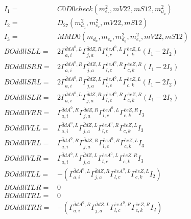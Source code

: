 \documentclass[A4,landscape]{article}
\begin{document}
\begin{align} 
I_1 = & C0D0check(m^2_{e_{{c}}}, mV22, mS12, m^2_{d_{{a}}}) \\ 
I_2 = & D_{27}(m^2_{d_{{a}}}, m^2_{e_{{c}}}, mV22, mS12) \\ 
I_3 = & MMD0(m_{d_{{a}}}, m_{e_{{c}}}, m^2_{d_{{a}}}, m^2_{e_{{c}}}, mV22, mS12) \\ 
  BOddllSLL= & 2  \Gamma^{\bar{d}d A^0 ,L}_{a, i} \Gamma^{\bar{d}d Z ,R}_{j, a} \Gamma^{\bar{e}e A^0 ,L}_{l, c} \Gamma^{\bar{e}e Z ,L}_{c, k} (I_1 - 2 I_2) \\ 
  BOddllSRR= & 2  \Gamma^{\bar{d}d A^0 ,R}_{a, i} \Gamma^{\bar{d}d Z ,L}_{j, a} \Gamma^{\bar{e}e A^0 ,R}_{l, c} \Gamma^{\bar{e}e Z ,R}_{c, k} (I_1 - 2 I_2) \\ 
  BOddllSRL= & 2  \Gamma^{\bar{d}d A^0 ,R}_{a, i} \Gamma^{\bar{d}d Z ,L}_{j, a} \Gamma^{\bar{e}e A^0 ,L}_{l, c} \Gamma^{\bar{e}e Z ,L}_{c, k} (I_1 - 2 I_2) \\ 
  BOddllSLR= & 2  \Gamma^{\bar{d}d A^0 ,L}_{a, i} \Gamma^{\bar{d}d Z ,R}_{j, a} \Gamma^{\bar{e}e A^0 ,R}_{l, c} \Gamma^{\bar{e}e Z ,R}_{c, k} (I_1 - 2 I_2) \\ 
  BOddllVRR= &  \Gamma^{\bar{d}d A^0 ,R}_{a, i} \Gamma^{\bar{d}d Z ,R}_{j, a} \Gamma^{\bar{e}e A^0 ,L}_{l, c} \Gamma^{\bar{e}e Z ,R}_{c, k} I_3 \\ 
  BOddllVLL= &  \Gamma^{\bar{d}d A^0 ,L}_{a, i} \Gamma^{\bar{d}d Z ,L}_{j, a} \Gamma^{\bar{e}e A^0 ,R}_{l, c} \Gamma^{\bar{e}e Z ,L}_{c, k} I_3 \\ 
  BOddllVRL= &  \Gamma^{\bar{d}d A^0 ,R}_{a, i} \Gamma^{\bar{d}d Z ,R}_{j, a} \Gamma^{\bar{e}e A^0 ,R}_{l, c} \Gamma^{\bar{e}e Z ,L}_{c, k} I_3 \\ 
  BOddllVLR= &  \Gamma^{\bar{d}d A^0 ,L}_{a, i} \Gamma^{\bar{d}d Z ,L}_{j, a} \Gamma^{\bar{e}e A^0 ,L}_{l, c} \Gamma^{\bar{e}e Z ,R}_{c, k} I_3 \\ 
  BOddllTLL= & -( \Gamma^{\bar{d}d A^0 ,L}_{a, i} \Gamma^{\bar{d}d Z ,R}_{j, a} \Gamma^{\bar{e}e A^0 ,L}_{l, c} \Gamma^{\bar{e}e Z ,L}_{c, k} I_2) \\ 
  BOddllTLR= & 0 \\ 
  BOddllTRL= & 0 \\ 
  BOddllTRR= & -( \Gamma^{\bar{d}d A^0 ,R}_{a, i} \Gamma^{\bar{d}d Z ,L}_{j, a} \Gamma^{\bar{e}e A^0 ,R}_{l, c} \Gamma^{\bar{e}e Z ,R}_{c, k} I_2) \\ 
\end{align} 
\end{document}
